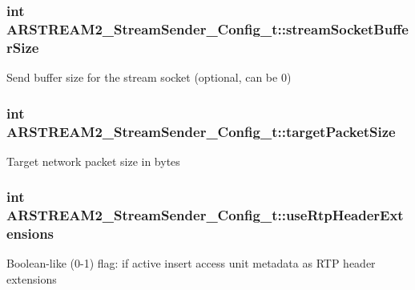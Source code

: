 \subsubsection[{\texorpdfstring{stream\+Socket\+Buffer\+Size}{streamSocketBufferSize}}]{\setlength{\rightskip}{0pt plus 5cm}int A\+R\+S\+T\+R\+E\+A\+M2\+\_\+\+Stream\+Sender\+\_\+\+Config\+\_\+t\+::stream\+Socket\+Buffer\+Size}\hypertarget{struct_a_r_s_t_r_e_a_m2___stream_sender___config__t_acba680e506f27b47148fe9d498efa88c}{}\label{struct_a_r_s_t_r_e_a_m2___stream_sender___config__t_acba680e506f27b47148fe9d498efa88c}
Send buffer size for the stream socket (optional, can be 0) 
\subsubsection[{\texorpdfstring{target\+Packet\+Size}{targetPacketSize}}]{\setlength{\rightskip}{0pt plus 5cm}int A\+R\+S\+T\+R\+E\+A\+M2\+\_\+\+Stream\+Sender\+\_\+\+Config\+\_\+t\+::target\+Packet\+Size}\hypertarget{struct_a_r_s_t_r_e_a_m2___stream_sender___config__t_aa88a311e8596181704d2a617be83028f}{}\label{struct_a_r_s_t_r_e_a_m2___stream_sender___config__t_aa88a311e8596181704d2a617be83028f}
Target network packet size in bytes 
\subsubsection[{\texorpdfstring{use\+Rtp\+Header\+Extensions}{useRtpHeaderExtensions}}]{\setlength{\rightskip}{0pt plus 5cm}int A\+R\+S\+T\+R\+E\+A\+M2\+\_\+\+Stream\+Sender\+\_\+\+Config\+\_\+t\+::use\+Rtp\+Header\+Extensions}\hypertarget{struct_a_r_s_t_r_e_a_m2___stream_sender___config__t_a653d22d6f8843a1a668979c680c06bc7}{}\label{struct_a_r_s_t_r_e_a_m2___stream_sender___config__t_a653d22d6f8843a1a668979c680c06bc7}
Boolean-\/like (0-\/1) flag\+: if active insert access unit metadata as R\+TP header extensions 
